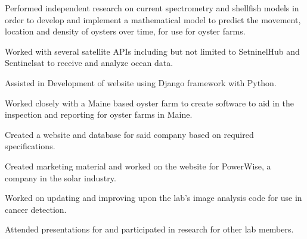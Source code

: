 \documentclass[letterpaper]{resume_AMcEnaney} %
\begin{document}
\begin{minipage}[t]{0.66\textwidth}
        \begin{tightitemize}
            \item Performed independent research on current spectrometry and shellfish models in order to develop and implement a mathematical model to predict the movement, location and density of oysters over time, for use for oyster farms.
            \item Worked with several satellite APIs including but not limited to SetninelHub and Sentinelsat to receive and analyze ocean data.
            \item Assisted in Development of website using Django framework with Python.
        \end{tightitemize}

        \sectionspace %



        \begin{tightitemize}
            \item Worked closely with a Maine based oyster farm to create software to aid in the inspection and reporting for oyster farms in Maine.
            \item Created a website and database for said company based on required specifications.
            \item Created marketing material and worked on the website for PowerWise, a company in the solar industry.
        \end{tightitemize}

        \sectionspace %



        \begin{tightitemize}
            \item Worked on updating and improving upon the lab's image analysis code for use in cancer detection.
            \item Attended presentations for and participated in research for other lab members.
        \end{tightitemize}


\end{minipage}
\end{document}
